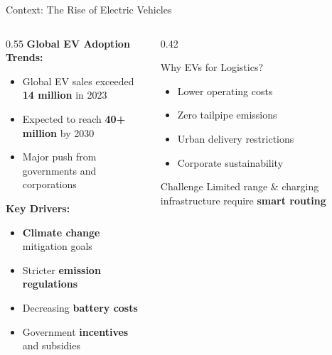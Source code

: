 \documentclass[aspectratio=169,11pt]{beamer}
\newcommand{\highlight}[1]{\textcolor{accentgreen}{\textbf{#1}}}
\begin{document}
\begin{frame}{Context: The Rise of Electric Vehicles}
    \begin{columns}[T]
        \begin{column}{0.55\textwidth}
            \textbf{Global EV Adoption Trends:}
            \begin{itemize}
                \item Global EV sales exceeded \textbf{14 million} in 2023
                \item Expected to reach \textbf{40+ million} by 2030
                \item Major push from governments and corporations
            \end{itemize}
            
            \vspace{0.5cm}
            \textbf{Key Drivers:}
            \begin{itemize}
                \item \highlight{Climate change} mitigation goals
                \item Stricter \highlight{emission regulations}
                \item Decreasing \highlight{battery costs}
                \item Government \highlight{incentives} and subsidies
            \end{itemize}
        \end{column}
        \begin{column}{0.42\textwidth}
            \begin{block}{Why EVs for Logistics?}
                \begin{itemize}
                    \item Lower operating costs
                    \item Zero tailpipe emissions
                    \item Urban delivery restrictions
                    \item Corporate sustainability
                \end{itemize}
            \end{block}
            
            \vspace{0.3cm}
            \begin{alertblock}{Challenge}
                Limited range \& charging infrastructure require \textbf{smart routing}
            \end{alertblock}
        \end{column}
    \end{columns}
\end{frame}
\end{document}
